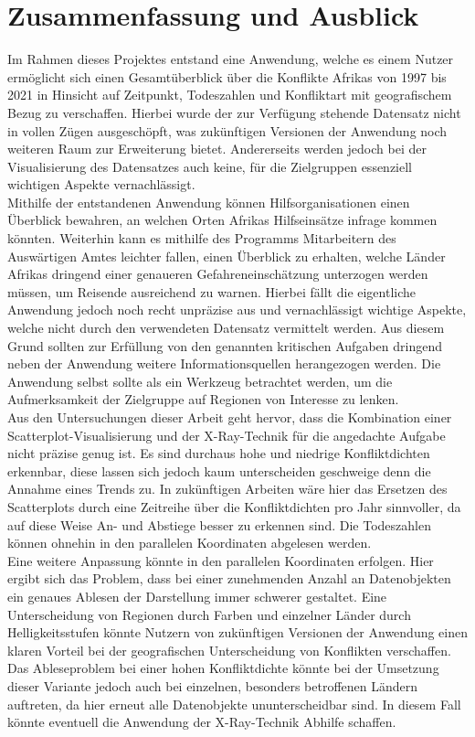 \documentclass[usegeometry=true]{scrartcl}
\begin{document}
\section{Zusammenfassung und Ausblick}
Im Rahmen dieses Projektes entstand eine Anwendung, welche es einem Nutzer ermöglicht sich einen Gesamtüberblick über die Konflikte Afrikas von 1997 bis 2021 in Hinsicht auf Zeitpunkt, Todeszahlen und Konfliktart mit geografischem Bezug zu verschaffen. Hierbei wurde der zur Verfügung stehende Datensatz nicht in vollen Zügen ausgeschöpft, was zukünftigen Versionen der Anwendung noch weiteren Raum zur Erweiterung bietet. Andererseits werden jedoch bei der Visualisierung des Datensatzes auch keine, für die Zielgruppen essenziell wichtigen Aspekte vernachlässigt.\\ Mithilfe der entstandenen Anwendung können Hilfsorganisationen einen Überblick bewahren, an welchen Orten Afrikas Hilfseinsätze infrage kommen könnten. Weiterhin kann es mithilfe des Programms Mitarbeitern des Auswärtigen Amtes leichter fallen, einen Überblick zu erhalten, welche Länder Afrikas dringend einer genaueren Gefahreneinschätzung unterzogen werden müssen, um Reisende ausreichend zu warnen. Hierbei fällt die eigentliche Anwendung jedoch noch recht unpräzise aus und vernachlässigt wichtige Aspekte, welche nicht durch den verwendeten Datensatz vermittelt werden. Aus diesem Grund sollten zur Erfüllung von den genannten kritischen Aufgaben dringend neben der Anwendung weitere Informationsquellen herangezogen werden. Die Anwendung selbst sollte als ein Werkzeug betrachtet werden, um die Aufmerksamkeit der Zielgruppe auf Regionen von Interesse zu lenken.\\

Aus den Untersuchungen dieser Arbeit geht hervor, dass die Kombination einer Scatterplot-Visualisierung und der X-Ray-Technik für die angedachte Aufgabe nicht präzise genug ist. Es sind durchaus hohe und niedrige Konfliktdichten erkennbar, diese lassen sich jedoch kaum unterscheiden geschweige denn die Annahme eines Trends zu. In zukünftigen Arbeiten wäre hier das Ersetzen des Scatterplots durch eine Zeitreihe über die Konfliktdichten pro Jahr sinnvoller, da auf diese Weise An- und Abstiege besser zu erkennen sind. Die Todeszahlen können ohnehin in den parallelen Koordinaten abgelesen werden.\\

Eine weitere Anpassung könnte in den parallelen Koordinaten erfolgen. Hier ergibt sich das Problem, dass bei einer zunehmenden Anzahl an Datenobjekten ein genaues Ablesen der Darstellung immer schwerer gestaltet. Eine Unterscheidung von Regionen durch Farben und einzelner Länder durch Helligkeitsstufen könnte Nutzern von zukünftigen Versionen der Anwendung einen klaren Vorteil bei der geografischen Unterscheidung von Konflikten verschaffen. Das Ableseproblem bei einer hohen Konfliktdichte könnte bei der Umsetzung dieser Variante jedoch auch bei einzelnen, besonders betroffenen Ländern auftreten, da hier erneut alle Datenobjekte ununterscheidbar sind. In diesem Fall könnte eventuell die Anwendung der X-Ray-Technik Abhilfe schaffen.\\
\end{document}
